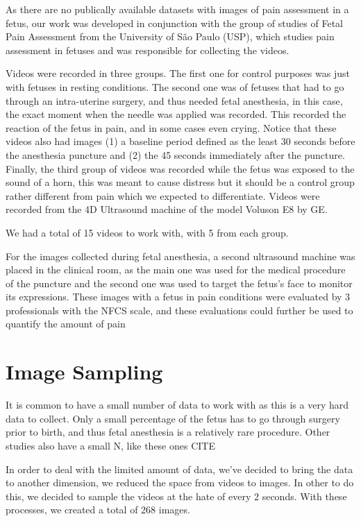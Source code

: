 As there are no publically available datasets with images of pain assessment in a fetus, our work was developed in conjunction with the group of studies of Fetal Pain Assessment from the University of São Paulo (USP), which studies pain assessment in fetuses and was responsible for collecting the videos.

Videos were recorded in three groups. The first one for control purposes was just with fetuses in resting conditions. The second one was of fetuses that had to go through an intra-uterine surgery, and thus needed fetal anesthesia, in this case, the exact moment when the needle was applied was recorded. This recorded the reaction of the fetus in pain, and in some cases even crying. Notice that these videos also had images (1) a baseline period defined as the least 30 seconds before the anesthesia puncture and (2) the 45 seconds immediately after the puncture. Finally, the third group of videos was recorded while the fetus was exposed to the sound of a horn, this was meant to cause distress but it should be a control group rather different from pain which we expected to differentiate. Videos were recorded from the 4D Ultrasound machine of the model Voluson E8 by GE. 

We had a total of 15 videos to work with, with 5 from each group.

For the images collected during fetal anesthesia, a second ultrasound machine was placed in the clinical room, as the main one was used for the medical procedure of the puncture and the second one was used to target the fetus's face to monitor its expressions. These images with a fetus in pain conditions were evaluated by 3 professionals with the NFCS scale, and these evaluations could further be used to quantify the amount of pain 

\section{Image Sampling}

It is common to have a small number of data to work with as this is a very hard data to collect. Only a small percentage of the fetus has to go through surgery prior to birth, and thus fetal anesthesia is a relatively rare procedure. Other studies also have a small N, like these ones CITE

In order to deal with the limited amount of data, we've decided to bring the data to another dimension, we reduced the space from videos to images. In other to do this, we decided to sample the videos at the hate of every 2 seconds. With these processes, we created a total of 268 images.

